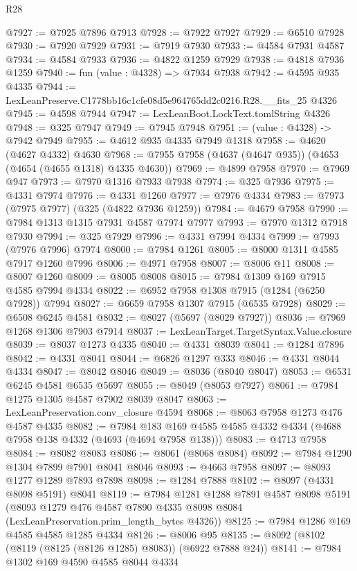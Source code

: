 \begin{lexlean}{R28}
\begin{coremodule}
@7927 := @7925 @7896 @7913
@7928 := @7922 @7927
@7929 := @6510 @7928
@7930 := @7920 @7929
@7931 := @7919 @7930
@7933 := @4584 @7931 @4587
@7934 := @4584 @7933
@7936 := @4822 @1259 @7929
@7938 := @4818 @7936 @1259
@7940 := fun (value : @4328) => @7934 @7938
@7942 := @4595 @935 @4335
@7944 := LexLeanPreserve.C1778bb16c1cfe08d5e964765dd2c0216.R28.__fits_25 @4326
@7945 := @4598 @7944
@7947 := LexLeanBoot.LockText.tomlString @4326
@7948 := @325 @7947
@7949 := @7945 @7948
@7951 := (value : @4328) -> @7942 @7949
@7955 := @4612 @935 @4335 @7949 @1318
@7958 := @4620 (@4627 @4332) @4630
@7968 := @7955 @7958 (@4637 (@4647 @935)) (@4653 (@4654 (@4655 @1318) @4335 @4630))
@7969 := @4899 @7958
@7970 := @7969 @947
@7973 := @7970 @1316 @7933 @7938
@7974 := @325 @7936
@7975 := @4331 @7974
@7976 := @4331 @1260
@7977 := @7976 @4334
@7983 := @7973 (@7975 @7977) (@325 (@4822 @7936 @1259))
@7984 := @4679 @7958
@7990 := @7984 @1313 @1315 @7931 @4587 @7974 @7977
@7993 := @7970 @1312 @7918 @7930
@7994 := @325 @7929
@7996 := @4331 @7994 @4334
@7999 := @7993 (@7976 @7996) @7974
@8000 := @7984 @1261
@8005 := @8000 @1311 @4585 @7917 @1260 @7996
@8006 := @4971 @7958
@8007 := @8006 @11
@8008 := @8007 @1260
@8009 := @8005 @8008
@8015 := @7984 @1309 @169 @7915 @4585 @7994 @4334
@8022 := @6952 @7958 @1308 @7915 (@1284 (@6250 @7928)) @7994
@8027 := @6659 @7958 @1307 @7915 (@6535 @7928)
@8029 := @6508 @6245 @4581
@8032 := @8027 (@5697 (@8029 @7927))
@8036 := @7969 @1268 @1306 @7903 @7914
@8037 := LexLeanTarget.TargetSyntax.Value.closure
@8039 := @8037 @1273 @4335
@8040 := @4331 @8039
@8041 := @1284 @7896
@8042 := @4331 @8041
@8044 := @6826 @1297 @333
@8046 := @4331 @8044 @4334
@8047 := @8042 @8046
@8049 := @8036 (@8040 @8047)
@8053 := @6531 @6245 @4581 @6535 @5697
@8055 := @8049 (@8053 @7927)
@8061 := @7984 @1275 @1305 @4587 @7902 @8039 @8047
@8063 := LexLeanPreservation.conv_closure @4594
@8068 := @8063 @7958 @1273 @476 @4587 @4335
@8082 := @7984 @183 @169 @4585 @4585 @4332 @4334 (@4688 @7958 @138 @4332 (@4693 (@4694 @7958 @138)))
@8083 := @4713 @7958
@8084 := @8082 @8083
@8086 := @8061 (@8068 @8084)
@8092 := @7984 @1290 @1304 @7899 @7901 @8041 @8046
@8093 := @4663 @7958
@8097 := @8093 @1277 @1289 @7893 @7898
@8098 := @1284 @7888
@8102 := @8097 (@4331 @8098 @5191) @8041
@8119 := @7984
    @1281
    @1288
    @7891
    @4587
    @8098
    @5191
    (@8093 @1279 @476 @4587 @7890 @4335 @8098 @8084 (LexLeanPreservation.prim_length_bytes @4326))
@8125 := @7984 @1286 @169 @4585 @4585 @1285 @4334
@8126 := @8006 @95
@8135 := @8092 (@8102 (@8119 (@8125 (@8126 @1285) @8083)) (@6922 @7888 @24))
@8141 := @7984 @1302 @169 @4590 @4585 @8044 @4334

\end{coremodule}
\end{lexlean}
